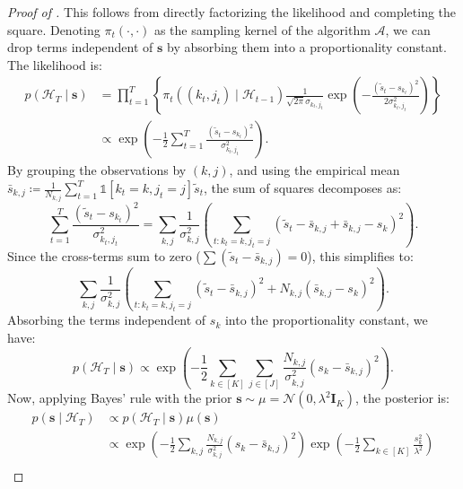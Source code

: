 \documentclass[10pt,a4paper]{amsart}
\def\gA{{\mathcal{A}}}
\def\gH{{\mathcal{H}}}
\def\gN{{\mathcal{N}}}
\newcommand{\indicator}{\mathds{1}}
\def\mI{{\bm{I}}}
\def\vs{{\bm{s}}}
\begin{document}
\begin{proof}[Proof of ]
    This follows from directly factorizing the likelihood and completing the square.
    Denoting $\pi_t(\cdot, \cdot)$ as the sampling kernel of the algorithm $\gA$, we can drop terms independent of $\vs$ by absorbing them into a proportionality constant. The likelihood is:
    \begin{align}
        p(\gH_T \mid \vs) &= \prod_{t=1}^T \left\{ \pi_t((k_t,j_t)\mid \gH_{t-1}) \frac{1}{\sqrt{2\pi}\sigma_{k_t,j_t}} \exp\left( - \frac{(\tilde{s}_t - s_{k_t})^2}{2\sigma_{k_t,j_t}^2} \right) \right\} \\
        &\propto \exp\left( - \frac{1}{2} \sum_{t=1}^T \frac{(\tilde{s}_t - s_{k_t})^2}{\sigma_{k_t,j_t}^2} \right).
    \end{align}
    By grouping the observations by $(k, j)$, and using the empirical mean $\bar{s}_{k,j} \coloneq \frac{1}{N_{k,j}} \sum_{t=1}^T \indicator[k_t = k, j_t = j] \tilde{s}_t$, the sum of squares decomposes as:
    \begin{equation}
        \sum_{t=1}^T \frac{(\tilde{s}_t - s_{k_t})^2}{\sigma_{k_t,j_t}^2} = \sum_{k,j} \frac{1}{\sigma_{k,j}^2} \left( \sum_{t: k_t=k, j_t=j} (\tilde{s}_t - \bar{s}_{k,j} + \bar{s}_{k,j} - s_{k})^2 \right).
    \end{equation}
    Since the cross-terms sum to zero ($\sum (\tilde{s}_t - \bar{s}_{k,j}) = 0$), this simplifies to:
    \begin{equation}
        \sum_{k,j} \frac{1}{\sigma_{k,j}^2} \left( \sum_{t: k_t=k, j_t=j} (\tilde{s}_t - \bar{s}_{k,j})^2 + N_{k,j}(\bar{s}_{k,j} - s_k)^2 \right).
    \end{equation}
    Absorbing the terms independent of $s_k$ into the proportionality constant, we have:
    \begin{equation}
        p(\gH_T \mid \vs) \propto \exp\left( - \frac{1}{2} \sum_{k \in [K]} \sum_{j \in [J]} \frac{N_{k,j}}{\sigma_{k,j}^2} (s_k - \bar{s}_{k,j})^2 \right).
    \end{equation}
    Now, applying Bayes' rule with the prior $\vs \sim \mu = \gN(0, \lambda^2 \mI_K)$, the posterior is:
    \begin{align}
        p(\vs \mid \gH_T) &\propto p(\gH_T \mid \vs) \mu(\vs) \\
        &\propto \exp\left( - \frac{1}{2} \sum_{k,j} \frac{N_{k,j}}{\sigma_{k,j}^2} (s_k - \bar{s}_{k,j})^2 \right) \exp\left( - \frac{1}{2} \sum_{k \in [K]} \frac{s_k^2}{\lambda^2} \right) \\

\end{align}
\end{proof}
\end{document}
